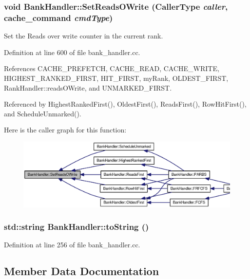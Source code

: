 \subsubsection[{SetReadsOWrite}]{\setlength{\rightskip}{0pt plus 5cm}void BankHandler::SetReadsOWrite ({\bf CallerType} {\em caller}, \/  {\bf cache\_\-command} {\em cmdType})}\label{classBankHandler_db51bdfe3e5dad885244280357c18f5f}


Set the Reads over write counter in the current rank. 



Definition at line 600 of file bank\_\-handler.cc.

References CACHE\_\-PREFETCH, CACHE\_\-READ, CACHE\_\-WRITE, HIGHEST\_\-RANKED\_\-FIRST, HIT\_\-FIRST, myRank, OLDEST\_\-FIRST, RankHandler::readsOWrite, and UNMARKED\_\-FIRST.

Referenced by HighestRankedFirst(), OldestFirst(), ReadsFirst(), RowHitFirst(), and ScheduleUnmarked().

Here is the caller graph for this function:\nopagebreak
\begin{figure}[H]
\begin{center}
\leavevmode
\includegraphics[width=420pt]{classBankHandler_db51bdfe3e5dad885244280357c18f5f_icgraph}
\end{center}
\end{figure}
\subsubsection[{toString}]{\setlength{\rightskip}{0pt plus 5cm}std::string BankHandler::toString ()}\label{classBankHandler_4d421b1df3349aeeeff7eb281de6c9b2}




Definition at line 256 of file bank\_\-handler.cc.

\subsection{Member Data Documentation}
